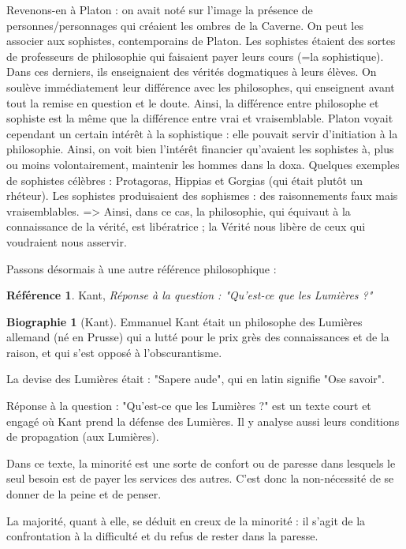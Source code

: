 \documentclass[french]{book}
\theoremstyle{definition}
\newtheorem*{refe}{Référence}
\newtheorem*{bio}{Biographie}
\begin{document}
Revenons-en à Platon : on avait noté sur l’image la présence de personnes/personnages qui créaient les ombres de la Caverne. On peut les associer aux sophistes, contemporains de Platon.
Les sophistes étaient des sortes de professeurs de philosophie qui faisaient payer leurs cours (=la sophistique). Dans ces derniers, ils enseignaient des vérités dogmatiques à leurs élèves. On soulève immédiatement leur différence avec les philosophes, qui enseignent avant tout la remise en question et le doute.
Ainsi, la différence entre philosophe et sophiste est la même que la différence entre vrai et vraisemblable.
Platon voyait cependant un certain intérêt à la sophistique : elle pouvait servir d’initiation à la philosophie.
Ainsi, on voit bien l’intérêt financier qu’avaient les sophistes à, plus ou moins volontairement, maintenir les hommes dans la doxa.
Quelques exemples de sophistes célèbres : Protagoras, Hippias et Gorgias (qui était plutôt un rhéteur).
Les sophistes produisaient des sophismes : des raisonnements faux mais vraisemblables.
=> Ainsi, dans ce cas, la philosophie, qui équivaut à la connaissance de la vérité, est libératrice ; la Vérité nous libère de ceux qui voudraient nous asservir.


Passons désormais à une autre référence philosophique :
\begin{refe}
	Kant, \textit{Réponse à la question : "Qu'est-ce que les Lumières ?"} 
\end{refe}

\begin{bio}[Kant]
	Emmanuel Kant était un philosophe des Lumières allemand (né en Prusse) qui a lutté pour le prix grès des connaissances et de la raison, et qui s'est opposé à l'obscurantisme.
\end{bio}

La devise des Lumières était : "Sapere aude", qui en latin signifie "Ose savoir".

Réponse à la question : "Qu'est-ce que les Lumières ?" est un texte court et engagé où Kant prend la défense des Lumières. Il y analyse aussi leurs conditions de propagation (aux Lumières).

Dans ce texte, la minorité est une sorte de confort ou de paresse dans lesquels le seul besoin est de payer les services des autres. C'est donc la non-nécessité de se donner de la peine et de penser.

La majorité, quant à elle, se déduit en creux de la minorité : il s'agit de la confrontation à la difficulté et du refus de rester dans la paresse.
\end{document}
